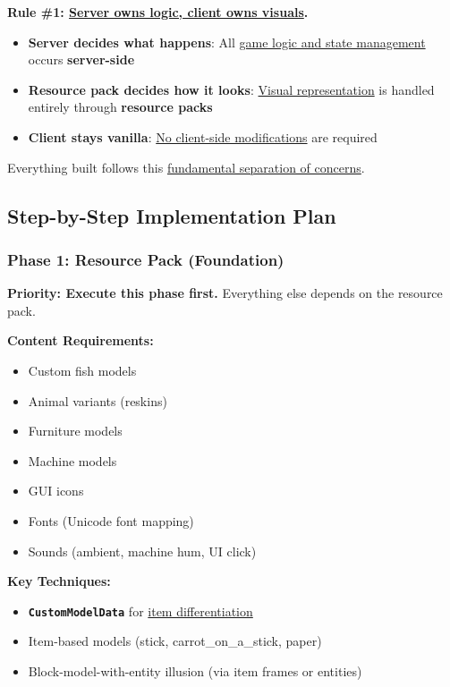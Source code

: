 \documentclass{article}
\begin{document}
\textbf{Rule \#1: \uline{Server owns logic, client owns visuals}.}

\begin{itemize}
    \item \textbf{Server decides what happens}: All \uline{game logic and state management} occurs \textbf{server-side}
    \item \textbf{Resource pack decides how it looks}: \uline{Visual representation} is handled entirely through \textbf{resource packs}
    \item \textbf{Client stays vanilla}: \uline{No client-side modifications} are required
\end{itemize}

Everything built follows this \uline{fundamental separation of concerns}.

\subsection{Step-by-Step Implementation Plan}

\subsubsection{Phase 1: Resource Pack (Foundation)}

\textbf{Priority: Execute this phase first.} Everything else depends on the resource pack.

\textbf{Content Requirements:}
\begin{itemize}
    \item Custom fish models
    \item Animal variants (reskins)
    \item Furniture models
    \item Machine models
    \item GUI icons
    \item Fonts (Unicode font mapping)
    \item Sounds (ambient, machine hum, UI click)
\end{itemize}

\textbf{Key Techniques:}
\begin{itemize}
    \item \textbf{\texttt{CustomModelData}} for \uline{item differentiation}
    \item Item-based models (stick, carrot\_on\_a\_stick, paper)
    \item Block-model-with-entity illusion (via item frames or entities)
\end{itemize}
\end{document}
